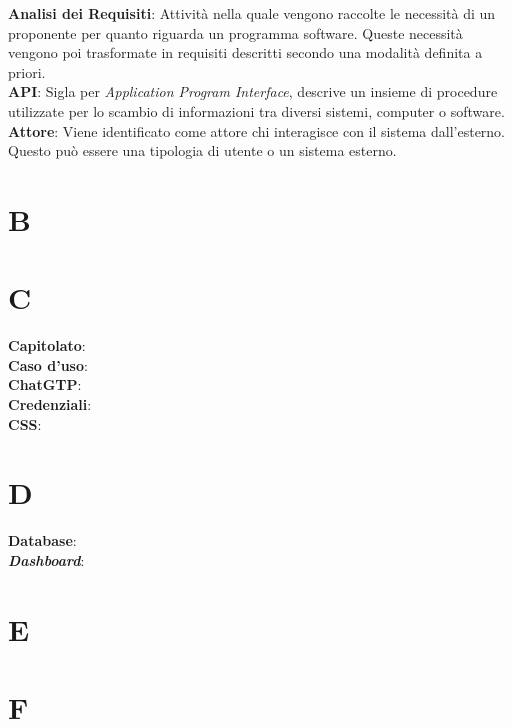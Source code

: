 \documentclass[5pt]{article}
\begin{document}
\textbf{Analisi dei Requisiti}: Attività nella quale vengono raccolte le necessità di un proponente per quanto riguarda un programma software. Queste necessità vengono poi trasformate in requisiti descritti secondo una modalità definita a priori. \\

\textbf{API}: Sigla per \textit{Application Program Interface}, descrive un insieme di procedure utilizzate per lo scambio di informazioni tra diversi sistemi, computer o software. \\

\textbf{Attore}: Viene identificato come attore chi interagisce con il sistema dall'esterno. Questo può essere una tipologia di utente o un sistema esterno. \\


\section*{B}

\section*{C}

\textbf{Capitolato}: \\

\textbf{Caso d'uso}: \\

\textbf{ChatGTP}: \\

\textbf{Credenziali}: \\

\textbf{CSS}: \\

\section*{D}

\textbf{Database}: \\

\textbf{\textit{Dashboard}}: \\

\section*{E}

\section*{F}
\end{document}
